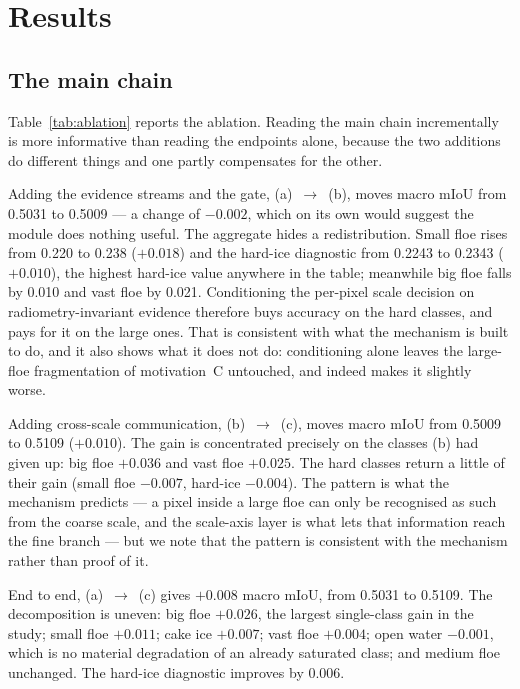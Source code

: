 \documentclass[preprint,12pt,authoryear]{elsarticle}
\begin{document}
\section{Results}
\label{sec:results}

\subsection{The main chain}

Table~\ref{tab:ablation} reports the ablation. Reading the main chain
incrementally is more informative than reading the endpoints alone, because the
two additions do different things and one partly compensates for the other.

Adding the evidence streams and the gate, (a)~$\rightarrow$~(b), moves macro
mIoU from 0.5031 to 0.5009 --- a change of $-0.002$, which on its own would
suggest the module does nothing useful. The aggregate hides a redistribution.
Small floe rises from 0.220 to 0.238 ($+0.018$) and the hard-ice diagnostic from
0.2243 to 0.2343 ($+0.010$), the highest hard-ice value anywhere in the table;
meanwhile big floe falls by 0.010 and vast floe by 0.021. Conditioning the
per-pixel scale decision on radiometry-invariant evidence therefore buys
accuracy on the hard classes, and pays for it on the large ones. That is
consistent with what the mechanism is built to do, and it also shows what it
does not do: conditioning alone leaves the large-floe fragmentation of
motivation~C untouched, and indeed makes it slightly worse.

Adding cross-scale communication, (b)~$\rightarrow$~(c), moves macro mIoU from
0.5009 to 0.5109 ($+0.010$). The gain is concentrated precisely on the classes
(b) had given up: big floe $+0.036$ and vast floe $+0.025$. The hard classes
return a little of their gain (small floe $-0.007$, hard-ice $-0.004$). The
pattern is what the mechanism predicts --- a pixel inside a large floe can only
be recognised as such from the coarse scale, and the scale-axis layer is what
lets that information reach the fine branch --- but we note that the pattern is
consistent with the mechanism rather than proof of it.

End to end, (a)~$\rightarrow$~(c) gives $+0.008$ macro mIoU, from 0.5031 to
0.5109. The decomposition is uneven: big floe $+0.026$, the largest single-class
gain in the study; small floe $+0.011$; cake ice $+0.007$; vast floe $+0.004$;
open water $-0.001$, which is no material degradation of an already saturated
class; and medium floe unchanged. The hard-ice diagnostic improves by $0.006$.
\end{document}
